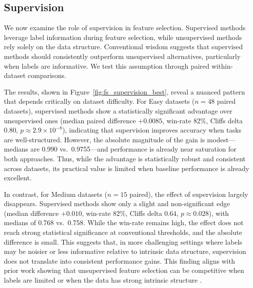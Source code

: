 \documentclass[preprint,12pt,authoryear]{elsarticle}
\begin{document}
{%


\subsection{Supervision}\label{sec:supervision_results}

We now examine the role of supervision in feature selection. Supervised methods leverage label information during feature selection, while unsupervised methods rely solely on the data structure. Conventional wisdom suggests that supervised methods should consistently outperform unsupervised alternatives, particularly when labels are informative. We test this assumption through paired within-dataset comparisons.

The results, shown in Figure~\ref{fig:fs_supervision_best}, reveal a nuanced pattern that depends critically on dataset difficulty. For Easy datasets ($n=48$ paired datasets), supervised methods show a statistically significant advantage over unsupervised ones (median paired difference $+0.0085$, win-rate 82\%, Cliffs delta $0.80$, $p \approx 2.9 \times 10^{-8}$), indicating that supervision improves accuracy when tasks are well-structured. However, the absolute magnitude of the gain is modest—medians are 0.990 vs.\ 0.9755—and performance is already near saturation for both approaches. Thus, while the advantage is statistically robust and consistent across datasets, its practical value is limited when baseline performance is already excellent.

In contrast, for Medium datasets ($n=15$ paired), the effect of supervision largely disappears. Supervised methods show only a slight and non-significant edge (median difference $+0.010$, win-rate 82\%, Cliffs delta $0.64$, $p \approx 0.028$), with medians of 0.768 vs.\ 0.758. While the win-rate remains high, the effect does not reach strong statistical significance at conventional thresholds, and the absolute difference is small. This suggests that, in more challenging settings where labels may be noisier or less informative relative to intrinsic data structure, supervision does not translate into consistent performance gains. This finding aligns with prior work showing that unsupervised feature selection can be competitive when labels are limited or when the data has strong intrinsic structure \cite{scitepress2019compare}.

}
\end{document}
